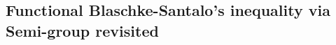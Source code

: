 \documentclass[11pt]{article}
\newcommand{\1}{[1]}
\begin{document}









\subsection{Functional Blaschke-Santalo's inequality via Semi-group revisited}
\end{document}
